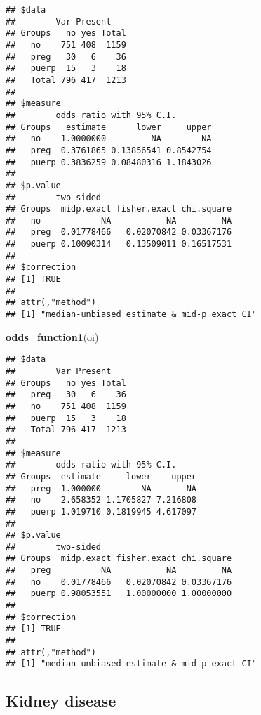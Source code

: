 \documentclass[
]{article}
\newenvironment{Shaded}{\begin{snugshade}}{\end{snugshade}}
\newcommand{\KeywordTok}[1]{\textcolor[rgb]{0.13,0.29,0.53}{\textbf{#1}}}
\newcommand{\NormalTok}[1]{#1}
\newcommand{\OperatorTok}[1]{\textcolor[rgb]{0.81,0.36,0.00}{\textbf{#1}}}
\newcommand{\StringTok}[1]{\textcolor[rgb]{0.31,0.60,0.02}{#1}}
\begin{document}
\begin{Shaded}
\end{Shaded}

\begin{verbatim}
## $data
##        Var Present
## Groups   no yes Total
##   no    751 408  1159
##   preg   30   6    36
##   puerp  15   3    18
##   Total 796 417  1213
## 
## $measure
##        odds ratio with 95% C.I.
## Groups   estimate      lower     upper
##   no    1.0000000         NA        NA
##   preg  0.3761865 0.13856541 0.8542754
##   puerp 0.3836259 0.08480316 1.1843026
## 
## $p.value
##        two-sided
## Groups  midp.exact fisher.exact chi.square
##   no            NA           NA         NA
##   preg  0.01778466   0.02070842 0.03367176
##   puerp 0.10090314   0.13509011 0.16517531
## 
## $correction
## [1] TRUE
## 
## attr(,"method")
## [1] "median-unbiased estimate & mid-p exact CI"
\end{verbatim}

\begin{Shaded}
\begin{Highlighting}[]
\KeywordTok{odds_function1}\NormalTok{(oi)}
\end{Highlighting}
\end{Shaded}

\begin{verbatim}
## $data
##        Var Present
## Groups   no yes Total
##   preg   30   6    36
##   no    751 408  1159
##   puerp  15   3    18
##   Total 796 417  1213
## 
## $measure
##        odds ratio with 95% C.I.
## Groups  estimate     lower    upper
##   preg  1.000000        NA       NA
##   no    2.658352 1.1705827 7.216808
##   puerp 1.019710 0.1819945 4.617097
## 
## $p.value
##        two-sided
## Groups  midp.exact fisher.exact chi.square
##   preg          NA           NA         NA
##   no    0.01778466   0.02070842 0.03367176
##   puerp 0.98053551   1.00000000 1.00000000
## 
## $correction
## [1] TRUE
## 
## attr(,"method")
## [1] "median-unbiased estimate & mid-p exact CI"
\end{verbatim}

\hypertarget{kidney-disease}{%
\subsection{Kidney disease}\label{kidney-disease}}
\end{document}
